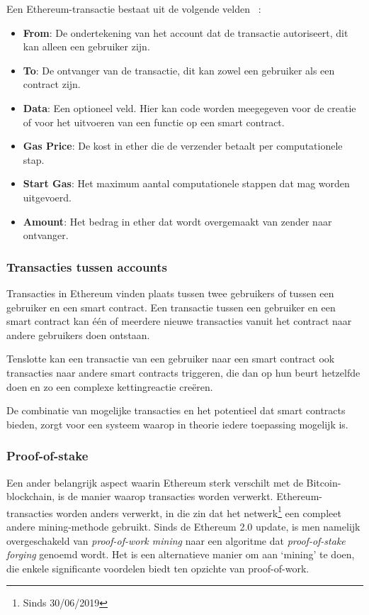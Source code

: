		Een Ethereum-transactie bestaat uit de volgende velden ~\autocite{Buterin2014}:
		\begin{itemize}
			\item \textbf{From}: De ondertekening van het account dat de transactie autoriseert, dit kan alleen een gebruiker zijn.
			\item \textbf{To}: De ontvanger van de transactie, dit kan zowel een gebruiker als een contract zijn. 
			\item \textbf{Data}: Een optioneel veld. Hier kan code worden meegegeven voor de creatie of voor het uitvoeren van een functie op een smart contract. 
			\item \textbf{Gas Price}: De kost in ether die de verzender betaalt per computationele stap.
			\item \textbf{Start Gas}: Het maximum aantal computationele stappen dat mag worden uitgevoerd.
			\item \textbf{Amount}: Het bedrag in ether dat wordt overgemaakt van zender naar ontvanger.
		\end{itemize}	
		\subsubsection{Transacties tussen accounts}
		Transacties in Ethereum vinden plaats tussen twee gebruikers of tussen een gebruiker en een smart contract. Een transactie tussen een gebruiker en een smart contract kan één of meerdere nieuwe transacties vanuit het contract naar andere gebruikers doen ontstaan. ~\autocite{Buterin2014}
		
		Tenslotte kan een transactie van een gebruiker naar een smart contract ook transacties naar andere smart contracts triggeren, die dan op hun beurt hetzelfde doen en zo een complexe kettingreactie creëren. ~\autocite{Buterin2014}
		
		De combinatie van mogelijke transacties en het potentieel dat smart contracts bieden, zorgt voor een systeem waarop in theorie iedere toepassing mogelijk is. ~\autocite{Wood2017}
		\subsubsection{Proof-of-stake}
			Een ander belangrijk aspect waarin Ethereum sterk verschilt met de Bitcoin-blockchain, is de manier waarop transacties worden verwerkt. Ethereum-transacties worden anders verwerkt, in die zin dat het netwerk\footnote{Sinds 30/06/2019} een compleet andere mining-methode gebruikt. Sinds de Ethereum 2.0 update, is men namelijk overgeschakeld van \textit{proof-of-work mining} naar een algoritme dat \textit{proof-of-stake forging} genoemd wordt. Het is een alternatieve manier om aan `mining' te doen, die enkele significante voordelen biedt ten opzichte van proof-of-work. 
		
